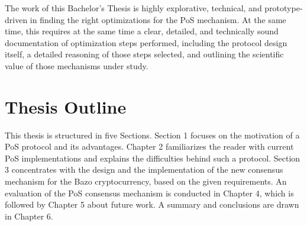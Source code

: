 The work of this Bachelor's Thesis is highly explorative, technical, and prototype-driven in finding the right optimizations for the PoS mechanism. At the same time, this requires at the same time a clear, detailed, and technically sound documentation of optimization steps performed, including the protocol design itself, a detailed reasoning of those steps selected, and outlining the scientific value of those mechanisms under study.

\section{Thesis Outline}
This thesis is structured in five Sections. Section 1 focuses on the motivation of a PoS protocol and its advantages. Chapter 2 familiarizes the reader with current PoS implementations and explains the difficulties behind such a protocol. Section 3 concentrates with the design and the implementation of the new consensus mechanism for the Bazo cryptocurrency, based on the given requirements. An evaluation of the PoS consensus mechanism is conducted in Chapter 4, which is followed by Chapter 5 about future work. A summary and conclusions are drawn in Chapter 6.